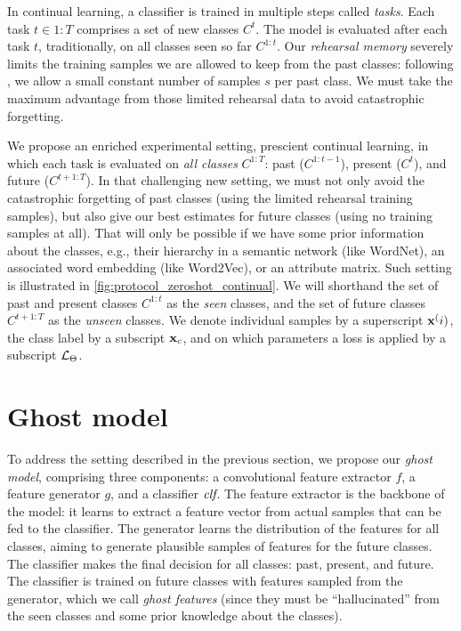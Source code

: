 In continual learning, a classifier is trained in multiple steps called \textit{tasks}. Each task
$t\in{1:T}$ comprises a set of new classes $C^t$. The model is evaluated after each task $t$,
traditionally, on all classes seen so far $C^{1:t}$. Our \textit{rehearsal memory} severely limits
the training samples we are allowed to keep from the past classes: following
\cite{hou2019ucir,douillard2020podnet}, we allow a small constant number of samples $s$ per past
class. We must take the maximum advantage from those limited rehearsal data to avoid catastrophic
forgetting.

We propose an enriched experimental setting, prescient continual learning, in which each task is
evaluated on \textit{all classes} $C^{1:T}$: past ($C^{1:t-1}$), present ($C^t$), and future
($C^{t+1:T}$). In that challenging new setting, we must not only avoid the catastrophic forgetting
of past classes (using the limited rehearsal training samples), but also give our best estimates for
future classes (using no training samples at all). That will only be possible if we have some prior
information about the classes, e.g., their hierarchy in a semantic network (like WordNet), an
associated word embedding (like Word2Vec), or an attribute matrix. Such setting is illustrated in
\autoref{fig:protocol_zeroshot_continual}. We will shorthand the set of past and present
classes $C^{1:t}$ as the \textit{seen} classes, and the set of future classes $C^{t+1:T}$ as the
\textit{unseen} classes. We denote individual samples by a superscript $\mathbf{x}^(i)$, the class
label by a subscript $\mathbf{x}_c$, and on which parameters a loss is applied by a subscript
$\mathcal{L}_\Theta$.

\section{Ghost model}
\label{sec:model}

To address the setting described in the previous section, we propose our \textit{ghost model},
comprising three components: a convolutional feature extractor $f$, a feature generator $g$, and a
classifier $\textit{clf}$. The feature extractor is the backbone of the model: it learns to extract a
feature vector from actual samples that can be fed to the classifier. The generator learns the
distribution of the features for all classes, aiming to generate plausible samples of features for
the future classes. The classifier makes the final decision for all classes: past, present, and
future. The classifier is trained on future classes with features sampled from the generator, which
we call \textit{ghost features} (since they must be “hallucinated” from the seen classes and some
prior knowledge about the classes).

